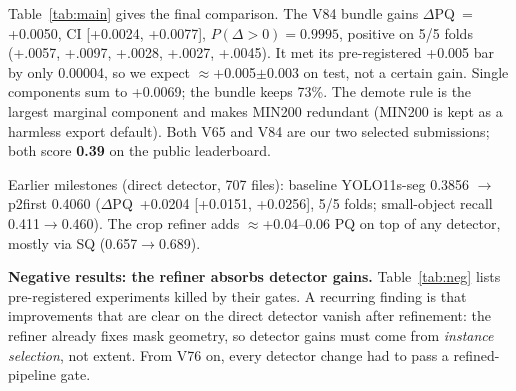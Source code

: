 \documentclass[sigconf]{acmart}
\newcommand{\dpq}{$\Delta$PQ}
\begin{document}
Table~\ref{tab:main} gives the final comparison. The V84 bundle gains \dpq\ = +0.0050, CI [+0.0024, +0.0077], $P(\Delta>0)=0.9995$, positive on 5/5 folds (+.0057, +.0097, +.0028, +.0027, +.0045). It met its pre-registered +0.005 bar by only 0.00004, so we expect $\approx$+0.005$\pm$0.003 on test, not a certain gain. Single components sum to +0.0069; the bundle keeps 73\%. The demote rule is the largest marginal component and makes MIN200 redundant (MIN200 is kept as a harmless export default). Both V65 and V84 are our two selected submissions; both score \textbf{0.39} on the public leaderboard.

Earlier milestones (direct detector, 707 files): baseline YOLO11s-seg 0.3856 $\to$ p2first 0.4060 (\dpq\ +0.0204 [+0.0151, +0.0256], 5/5 folds; small-object recall 0.411$\to$0.460). The crop refiner adds $\approx$+0.04--0.06 PQ on top of any detector, mostly via SQ (0.657$\to$0.689).

\textbf{Negative results: the refiner absorbs detector gains.} Table~\ref{tab:neg} lists pre-registered experiments killed by their gates. A recurring finding is that improvements that are clear on the direct detector vanish after refinement: the refiner already fixes mask geometry, so detector gains must come from \emph{instance selection}, not extent. From V76 on, every detector change had to pass a refined-pipeline gate.
\end{document}
